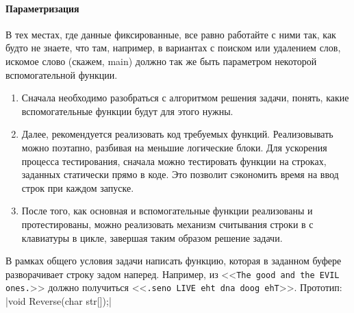 \paragraph{Параметризация}
В тех местах, где данные фиксированные, все равно работайте с ними так, как будто не знаете, что там, например, в вариантах с поиском или удалением слов, искомое слово (скажем, main) должно так же быть параметром некоторой вспомогательной функции.
\begin{comment}
\begin{itemize}
    \item Тут нужно напомнить, что у нас называется строкой, что это просто массив символов, а то и просто чисел-кодов с нулем на конце
    \item Можно еще побеседовать про разбиение на подзадачи. Подсказать, на какие логично фунции разбивать программу. Например, поиск слов если нужен и тп.
    \item Про вспомогательные функции - вычисление длины строки isalnum и тп.
\end{itemize}
\end{comment}


\zzsectionPLAN
\begin{enumerate}
	\item Сначала необходимо разобраться с алгоритмом решения задачи, понять, какие вспомогательные функции будут для этого нужны.
	\item Далее, рекомендуется реализовать код требуемых функций. Реализовывать можно поэтапно, разбивая на меньшие логические блоки. Для ускорения процесса тестирования, сначала можно тестировать функции на строках, заданных статически прямо в коде. Это позволит сэкономить время на ввод строк при каждом запуске.
	\item После того, как основная и вспомогательные функции реализованы и протестированы, можно реализовать механизм считывания строки в с клавиатуры в цикле, завершая таким образом решение задачи.
\end{enumerate}


\zzsectionVARIATIONS


\begin{zztask}
В рамках общего условия задачи написать функцию, которая в заданном буфере
разворачивает строку задом наперед.
Например, из
<<\texttt{The good and the EVIL ones.}>>
должно получиться
<<\texttt{.seno LIVE eht dna doog ehT}>>.
%
Прототип: |void Reverse(char str[]);|
\end{zztask}


